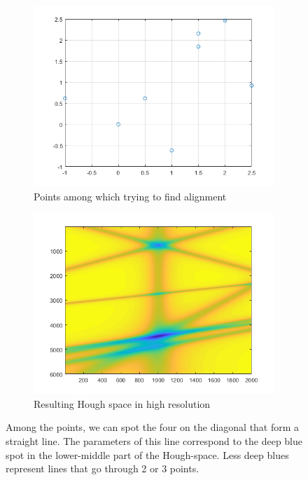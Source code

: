 \documentclass[12pt]{article}
\begin{document}
\begin{figure}[H]
	\centering
	\begin{subfigure}{.5\textwidth}
		\centering
		\includegraphics[width=\linewidth]{velout_hough_points}
		\caption{Points among which trying to find alignment}
		\label{fig_velout_hough_points}
	\end{subfigure}%
	\begin{subfigure}{.5\textwidth}
		\centering
		\includegraphics[width=\linewidth]{velout_hough_param_space}
		\caption{Resulting Hough space in high resolution}
		\label{fig_velout_hough_param_space}
	\end{subfigure}
	\caption[Point and the Hough-space of alternative line finding]{Among the points, we can spot the four on the diagonal that form a straight line. The parameters of this line correspond to the deep blue spot in the lower-middle part of the Hough-space. Less deep blues represent lines that go through 2 or 3 points.}
	\label{fig_velout_hough_method}
\end{figure}
\end{document}
